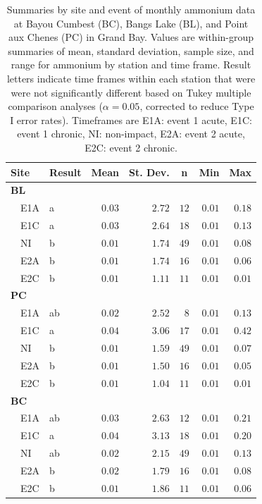 \documentclass[letterpaper,12pt]{article}\usepackage[]{graphicx}\usepackage[]{color}
\begin{document}
\begin{table}[!tbp]
\caption{Summaries by site and event of monthly ammonium data at Bayou Cumbest (BC), Bangs Lake (BL), and Point aux Chenes (PC) in Grand Bay.  Values are within-group summaries of mean, standard deviation, sample size, and range for ammonium by station and time frame.  Result letters indicate time frames within each station that were were not significantly different based on Tukey multiple comparison analyses ($\alpha = 0.05$, corrected to reduce Type I error rates). Timeframes are E1A: event 1 acute, E1C: event 1 chronic, NI: non-impact, E2A: event 2 acute, E2C: event 2 chronic.\label{tab:ammontab}} 
\begin{center}
\begin{tabular}{llrrrrr}
\hline\hline
\multicolumn{1}{l}{Site}&\multicolumn{1}{c}{Result}&\multicolumn{1}{c}{Mean}&\multicolumn{1}{c}{St. Dev.}&\multicolumn{1}{c}{n}&\multicolumn{1}{c}{Min}&\multicolumn{1}{c}{Max}\tabularnewline
\hline
{\bfseries BL}&&&&&&\tabularnewline
~~E1A&a&$0.03$&$2.72$&$12$&$0.01$&$0.18$\tabularnewline
~~E1C&a&$0.03$&$2.64$&$18$&$0.01$&$0.13$\tabularnewline
~~NI&b&$0.01$&$1.74$&$49$&$0.01$&$0.08$\tabularnewline
~~E2A&b&$0.01$&$1.74$&$16$&$0.01$&$0.06$\tabularnewline
~~E2C&b&$0.01$&$1.11$&$11$&$0.01$&$0.01$\tabularnewline
\hline
{\bfseries PC}&&&&&&\tabularnewline
~~E1A&ab&$0.02$&$2.52$&$ 8$&$0.01$&$0.13$\tabularnewline
~~E1C&a&$0.04$&$3.06$&$17$&$0.01$&$0.42$\tabularnewline
~~NI&b&$0.01$&$1.59$&$49$&$0.01$&$0.07$\tabularnewline
~~E2A&b&$0.01$&$1.50$&$16$&$0.01$&$0.05$\tabularnewline
~~E2C&b&$0.01$&$1.04$&$11$&$0.01$&$0.01$\tabularnewline
\hline
{\bfseries BC}&&&&&&\tabularnewline
~~E1A&ab&$0.03$&$2.63$&$12$&$0.01$&$0.21$\tabularnewline
~~E1C&a&$0.04$&$3.13$&$18$&$0.01$&$0.20$\tabularnewline
~~NI&ab&$0.02$&$2.15$&$49$&$0.01$&$0.13$\tabularnewline
~~E2A&b&$0.02$&$1.79$&$16$&$0.01$&$0.08$\tabularnewline
~~E2C&b&$0.01$&$1.86$&$11$&$0.01$&$0.06$\tabularnewline
\hline
\end{tabular}\end{center}

\end{table}

\clearpage
\end{document}
